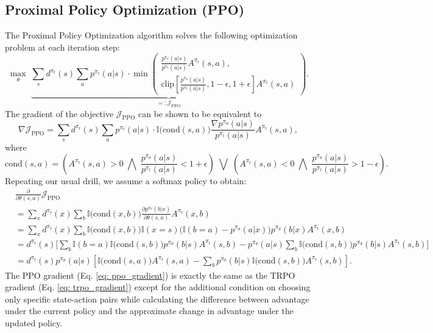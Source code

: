 \documentclass[a4paper, 10pt]{article}
\begin{document}
\subsection{Proximal Policy Optimization (PPO)} \label{app:ppo}
The Proximal Policy Optimization algorithm \citep{schulman2017proximal} solves the following optimization problem at each iteration step:
\begin{equation}
  \max_\theta \; \underbrace{\sum_s d^{\pi_t}(s) \sum_a p^{\pi_t}(a | s) \cdot \min \left( \begin{matrix} \frac{p^{\pi_\theta}(a | s)}{p^{\pi_t}(a | s)} A^{\pi_t}(s, a), \\ \text{clip} \left[\frac{p^{\pi_\theta}(a | s)}{p^{\pi_t}(a | s)}, 1 - \epsilon, 1 + \epsilon \right] A^{\pi_t}(s, a) \end{matrix} \right)}_{=: \mathcal{J}_{\text{PPO}}}.
\end{equation}
The gradient of the objective $\mathcal{J}_{\text{PPO}}$ can be shown to be equivalent to
\begin{equation}
  \nabla \mathcal{J}_{\text{PPO}} = \sum_s d^{\pi_t}(s) \sum_a p^{\pi_t}(a | s) \cdot \mathbb{I} \Big( \text{cond}(s, a) \Big) \frac{\nabla p^{\pi_\theta}(a | s)}{p^{\pi_t}(a | s)} A^{\pi_t}(s, a),
\end{equation}
where 
\begin{equation}
  \text{cond}(s, a) = \left( A^{\pi_t}(s, a) > 0 \;\bigwedge\; \frac{p^{\pi_\theta}(a | s)}{p^{\pi_t}(a | s)} < 1 + \epsilon \right) \;\bigvee\; \left( A^{\pi_t}(s, a) < 0 \;\bigwedge\; \frac{p^{\pi_\theta}(a | s)}{p^{\pi_t}(a | s)} > 1 - \epsilon \right).
\end{equation}
Repeating our usual drill, we assume a softmax policy to obtain:
\begin{align}
  & \frac{\partial}{\partial \theta(s, a)} \mathcal{J}_{\text{PPO}} \nonumber \\
  &= \sum_x d^{\pi_t}(x) \sum_b \mathbb{I} \Big( \text{cond}(x, b) \Big) \frac{\partial p^{\pi_\theta}(b | x)}{\partial \theta(s, a)} A^{\pi_t}(x, b) \nonumber \\
  &= \sum_x d^{\pi_t}(x) \sum_b \mathbb{I} \Big( \text{cond}(x, b) \Big) \mathbb{I}(x = s) \Big( \mathbb{I}(b = a) - p^{\pi_\theta}(a | x) \Big) p^{\pi_\theta}(b | x) A^{\pi_t}(x, b) \nonumber \\
  &= d^{\pi_t}(s) \Bigg[ \sum_b \mathbb{I}(b = a) \mathbb{I} \Big( \text{cond}(s, b) \Big) p^{\pi_\theta}(b | s) A^{\pi_t}(s, b) - p^{\pi_\theta}(a | s) \sum_b \mathbb{I} \Big( \text{cond}(s, b) \Big) p^{\pi_\theta}(b | s) A^{\pi_t}(s, b) \Bigg] \nonumber \\
    &= d^{\pi_t}(s) p^{\pi_\theta}(a | s) \left[ \mathbb{I} \Big( \text{cond}(s, a) \Big) A^{\pi_t}(s, a) - \sum_b p^{\pi_\theta}(b | s) \mathbb{I} \Big( \text{cond}(s, b) \Big) A^{\pi_t}(s, b) \right]. \label{eq: ppo_gradient}
\end{align}
The PPO gradient (Eq. \ref{eq: ppo_gradient}) is exactly the same as the TRPO gradient (Eq. \ref{eq: trpo_gradient}) except for the additional condition on choosing only specific state-action pairs while calculating the difference between advantage under the current policy and the approximate change in advantage under the updated policy.
\end{document}
